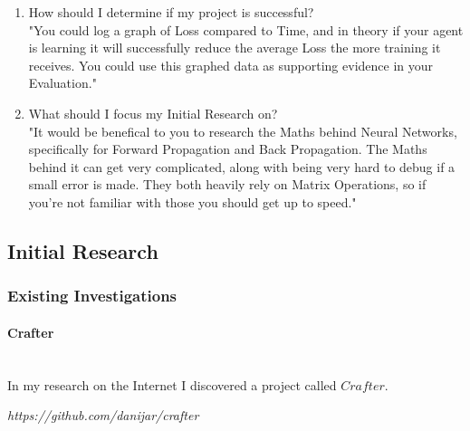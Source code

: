 \begin{flushleft}
\begin{enumerate}
                \vspace{0.5cm}
                \item {\large How should I determine if my project is successful?} \\
                \vspace{0.2cm}
                "You could log a graph of Loss compared to Time, and in theory if your agent is learning it will successfully reduce the average Loss 
                the more training it receives. You could use this graphed data as supporting evidence in your Evaluation."

                \vspace{0.5cm}
                \item {\large What should I focus my Initial Research on?} \\
                \vspace{0.2cm}
                "It would be benefical to you to research the Maths behind Neural Networks, specifically for Forward Propagation
                and Back Propagation. The Maths behind it can get very complicated, along with being very hard to debug if a small error is made.
                They both heavily rely on Matrix Operations, so if you're not familiar with those you should get up to speed."

                \vspace{0.5cm}
            \end{enumerate}
            
        \vspace{1cm}
        \subsection{Initial Research}
                \subsubsection{Existing Investigations} 
                    \paragraph{Crafter} \mbox{} \\
                        \vspace{0.2cm}
                            In my research on the Internet I discovered a project called $Crafter$. \\

                            \vspace{0.2cm}
                            \centerline{\textit{https://github.com/danijar/crafter}}
                            \vspace{0.2cm}


\end{flushleft}
